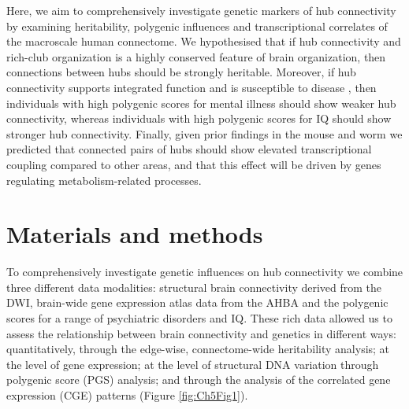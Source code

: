 Here, we aim to comprehensively investigate genetic markers of hub connectivity by examining heritability, polygenic influences and transcriptional correlates of the macroscale human connectome. We hypothesised that if hub connectivity and rich-club organization is a highly conserved feature of brain organization, then connections between hubs should be strongly heritable. Moreover, if hub connectivity supports integrated function and is susceptible to disease \citep{Crossley2016a,Fornito2015}, then individuals with high polygenic scores for mental illness should show weaker hub connectivity, whereas individuals with high polygenic scores for IQ should show stronger hub connectivity. Finally, given prior findings in the mouse \citep{Fulcher2016} and worm \citep{Arnatkeviciute2018} we predicted that connected pairs of hubs should show elevated transcriptional coupling compared to other areas, and that this effect will be driven by genes regulating metabolism-related processes.

\section{Materials and methods}

To comprehensively investigate genetic influences on hub connectivity we combine three different data modalities: structural brain connectivity derived from the DWI, brain-wide gene expression atlas data from the AHBA and the polygenic scores for a range of psychiatric disorders and IQ. These rich data allowed us to assess the relationship between brain connectivity and genetics in different ways: quantitatively, through the edge-wise, connectome-wide heritability analysis; at the level of gene expression; at the level of structural DNA variation through polygenic score (PGS) analysis; and through the analysis of the correlated gene expression (CGE) patterns (Figure \ref{fig:Ch5Fig1}).

